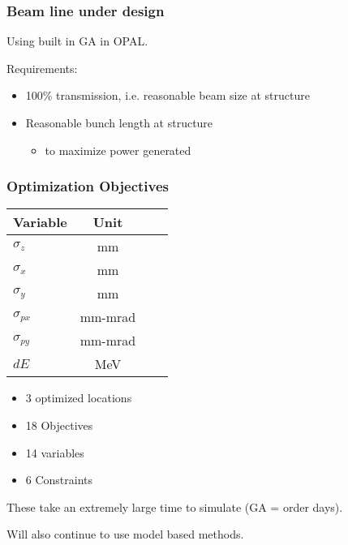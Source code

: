 \documentclass[professionalfonts,t]{beamer}
\newcommand\Wider[2][3em]{%
	\makebox[\linewidth][c]{%
		\begin{minipage}{\dimexpr\textwidth+#1\relax}
			\raggedright#2
		\end{minipage}%
	}%
}
\begin{document}
\begin{frame}
\frametitle{Beam line under design}
\Wider[4em]{

\begin{center}
\begin{tikzpicture}[scale=\textwidth/26cm, text=black]

\end{tikzpicture}
\end{center}

}
\vspace{-1em}

Using built in GA in OPAL.

\vspace{0.5em}
Requirements:
\begin{itemize}
	\item 100\% transmission, i.e. reasonable beam size at structure
	\item Reasonable bunch length at structure
	\begin{itemize}
		\item to maximize power generated
	\end{itemize}
\end{itemize}

\end{frame}


\begin{frame}
\frametitle{Optimization Objectives}
\vspace{1em}
\begin{minipage}{0.45\textwidth}
	\begin{table}[hbt] 
		\centering
		\begin{tabular}{ l *{3}{c}}
			\toprule
			\textbf{Variable} &  \textbf{Unit} \\
			\midrule
			$\sigma_z$ 		& mm \\
			$\sigma_{x}$ 	& mm \\
			$\sigma_y$ 		& mm \\
			$\sigma_{px}$ 	& mm-mrad \\
			$\sigma_{py}$ 	& mm-mrad \\
			$dE$			& MeV\\
			\bottomrule	
		\end{tabular}	
	\end{table}
\end{minipage}
\begin{minipage}{0.45\textwidth}
	\begin{itemize}
		\item 3 optimized locations 
		\item 18 Objectives
		\item 14 variables 
		\item 6 Constraints
	\end{itemize}
\end{minipage}
\centering
These take an extremely large time to simulate (GA = order days).

Will also continue to use model based methods.
\end{frame}
\end{document}
